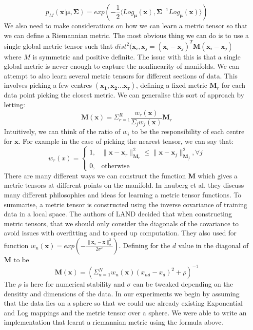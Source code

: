 \documentclass{article}
\begin{document}
$$p_M(\bm{x}|\bm{\mu},\bm{\Sigma}) = exp(-\frac{1}{2}\langle Log_{\bm{\mu}}(\bm{x}),
\bm{\Sigma}^{-1}Log_{\bm{\mu}}(\bm{x})\rangle)$$
We also need to make considerations on how we can learn a metric tensor so that we can define a Riemannian metric.
The most obvious thing we can do is to use a single global metric tensor such that $dist^2(\bm{x}_i, \bm{x}_j = (\bm{x}_i-\bm{x}_j)^T\bm{M}(\bm{x}_i-\bm{x}_j)$ where $M$ is symmetric and positive definite.
The issue with this is that a single global metric is never enough to capture the nonlinearity of manifolds.
We can attempt to also learn several metric tensors for different sections of data.
This involves picking a few centres $(\bm{x_1}, \bm{x_2} ... \bm{x_r})$, defining a fixed metric $\bm{M}_r$ for each data point picking the closest metric.
We can generalise this sort of approach by letting:
$$\bm{M}(\bm{x}) = \Sigma_{r=1}^R\frac{w_r(\bm{x})}{\Sigma_jw_j(\bm{x})}\bm{M}_r$$
Intuitively, we can think of the ratio of $w_i$ to be the responsibility of each centre for $\bm{x}$.
For example in the case of picking the nearest tensor, we can say that:
$$w_r(x) = \begin{cases} 1,&\|\bm{x}-\bm{x}_r\|_{\bm{M}_r}^2 \leq \|\bm{x}-\bm{x}_j\|_{\bm{M}_j}^2, \forall j \\
0,& \text{otherwise}\end{cases}$$
There are many different ways we can construct the function $\bm{M}$ which gives a metric tensors at different points on the manifold.
In hauberg et al.\cite{haubergGeometricTakeOnMetricLearning} they discuss many different philosophies and ideas for learning a metric tensor functions.
To summarise, a metric tensor is constructed using the inverse covariance of training data in a local space.
The authors of LAND decided that when constructing metric tensors, that we should only consider the diagonals of the covariance to avoid issues with overfitting and to speed up computation.
They also used for function $w_n(\bm{x}) = exp(-\frac{\|\bm{x}_n-\bm{x}\|_2^2}{2\sigma^2})$.
Defining for the $d$ value in the diagonal of $\bm{M}$ to be $$\bm{M}(\bm{x}) = (\Sigma_{n=1}^Nw_n(\bm{x})(x_{nd}-x_d)^2+\rho)^{-1}$$
The $\rho$ is here for numerical stability and $\sigma$ can be tweaked depending on the densitty and dimensions of the data.
In our experiments we begin by assuming that the data lies on a sphere so that we could use already existing Exponential and Log mappings and the metric tensor over a sphere.
We were able to write an implementation that learnt a riemannian metric using the formula above.
\end{document}
